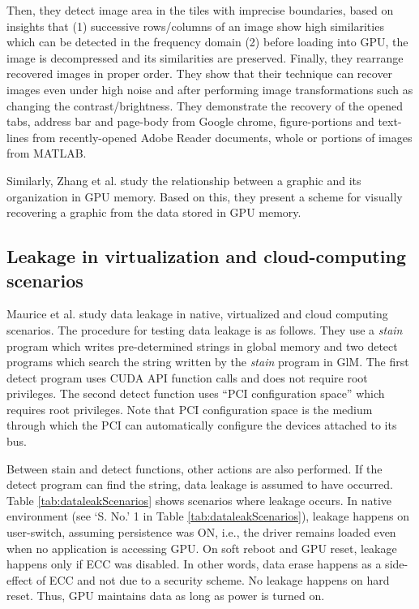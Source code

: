 Then, they detect image area in the tiles with imprecise boundaries, based on insights that (1) successive rows/columns of an image show high similarities which can be detected in the frequency domain (2) before loading into GPU, the image is decompressed and its similarities are preserved. Finally, they rearrange recovered images in proper order. They show that their technique can recover images even under high noise and after performing image transformations such as changing the contrast/brightness. They demonstrate  the recovery of the opened tabs, address bar and page-body from Google chrome, figure-portions and text-lines from recently-opened Adobe Reader documents, whole or portions of images from MATLAB.

 


Similarly, Zhang et al. \cite{zhang2015forensically} study the relationship between a graphic and its organization in GPU memory. Based on this, they present a scheme for visually recovering a graphic from the data stored in GPU memory.

\subsection{Leakage in virtualization and cloud-computing scenarios}\label{sec:leakagevirtualized} 

Maurice et al.  \cite{maurice2014confidentiality} study data leakage in native, virtualized and cloud computing scenarios. The procedure for testing data leakage is as follows. They use a \textit{stain} program which writes pre-determined strings in global memory and two detect programs which search the string written by the \textit{stain} program in GlM. The first detect program uses CUDA API function calls and does not require root privileges. The second detect function uses ``PCI configuration space'' which requires root privileges. Note that PCI configuration space is the medium through which the PCI can automatically configure the devices attached to its bus. 
 


Between stain and detect functions, other actions are also performed. If the detect program can find the string, data leakage is assumed to have occurred. Table \ref{tab:dataleakScenarios} shows scenarios where leakage occurs. In native environment (see `S. No.' 1 in Table \ref{tab:dataleakScenarios}), leakage happens on user-switch, assuming persistence was ON, i.e., the driver remains loaded even when no application is accessing GPU. On soft reboot and GPU reset, leakage happens only if ECC was disabled. In other words, data erase happens as a side-effect of ECC and not due to a security scheme. No leakage happens on hard reset. Thus, GPU maintains data as long as power is turned on.


